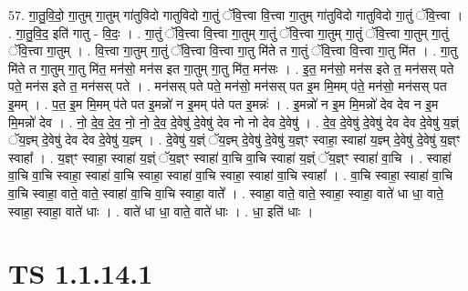 \documentclass[17pt]{extarticle}
\begin{document}
57. गा॒तु॒वि॒दो॒ गा॒तुम् गा॒तुम् गा॑तुविदो गातुविदो गा॒तुं ॅवि॒त्त्वा वि॒त्त्वा गा॒तुम् गा॑तुविदो गातुविदो गा॒तुं ॅवि॒त्त्वा । . गा॒तु॒वि॒द॒ इति॑ गातु - वि॒दः॒ । . गा॒तुं ॅवि॒त्त्वा वि॒त्त्वा गा॒तुम् गा॒तुं ॅवि॒त्त्वा गा॒तुम् गा॒तुं ॅवि॒त्त्वा गा॒तुम् गा॒तुं ॅवि॒त्त्वा गा॒तुम् । . वि॒त्त्वा गा॒तुम् गा॒तुं ॅवि॒त्त्वा वि॒त्त्वा गा॒तु मि॑ते त गा॒तुं ॅवि॒त्त्वा वि॒त्त्वा गा॒तु मि॑त । . गा॒तु मि॑ते त गा॒तुम् गा॒तु मि॑त॒ मन॑सो॒ मन॑स इत गा॒तुम् गा॒तु मि॑त॒ मन॑सः । . इ॒त॒ मन॑सो॒ मन॑स इते त॒ मन॑सस् पते पते॒ मन॑स इते त॒ मन॑सस् पते । . मन॑सस् पते पते॒ मन॑सो॒ मन॑सस् पत इ॒म मि॒मम् प॑ते॒ मन॑सो॒ मन॑सस् पत इ॒मम् । . प॒त॒ इ॒म मि॒मम् प॑ते पत इ॒मन्नो॑ न इ॒मम् प॑ते पत इ॒मन्नः॑ । . इ॒मन्नो॑ न इ॒म मि॒मन्नो॑ देव देव न इ॒म मि॒मन्नो॑ देव । . नो॒ दे॒व॒ दे॒व॒ नो॒ नो॒ दे॒व॒ दे॒वेषु॑ दे॒वेषु॑ देव नो नो देव दे॒वेषु॑ । . दे॒व॒ दे॒वेषु॑ दे॒वेषु॑ देव देव दे॒वेषु॑ य॒ज्ञ्ं ॅय॒ज्ञ्म् दे॒वेषु॑ देव देव दे॒वेषु॑ य॒ज्ञ्म् । . दे॒वेषु॑ य॒ज्ञ्ं ॅय॒ज्ञ्म् दे॒वेषु॑ दे॒वेषु॑ य॒ज्ञ्ꣳ स्वाहा॒ स्वाहा॑ य॒ज्ञ्म् दे॒वेषु॑ दे॒वेषु॑ य॒ज्ञ्ꣳ स्वाहा᳚ । . य॒ज्ञ्ꣳ स्वाहा॒ स्वाहा॑ य॒ज्ञ्ं ॅय॒ज्ञ्ꣳ स्वाहा॑ वा॒चि वा॒चि स्वाहा॑ य॒ज्ञ्ं ॅय॒ज्ञ्ꣳ स्वाहा॑ वा॒चि । . स्वाहा॑ वा॒चि वा॒चि स्वाहा॒ स्वाहा॑ वा॒चि स्वाहा॒ स्वाहा॑ वा॒चि स्वाहा॒ स्वाहा॑ वा॒चि स्वाहा᳚ । . वा॒चि स्वाहा॒ स्वाहा॑ वा॒चि वा॒चि स्वाहा॒ वाते॒ वाते॒ स्वाहा॑ वा॒चि वा॒चि स्वाहा॒ वाते᳚ । . स्वाहा॒ वाते॒ वाते॒ स्वाहा॒ स्वाहा॒ वाते॑ धा धा॒ वाते॒ स्वाहा॒ स्वाहा॒ वाते॑ धाः । . वाते॑ धा धा॒ वाते॒ वाते॑ धाः । . धा॒ इति॑ धाः । \newline
\pagebreak
{}
\section*{ TS 1.1.14.1 }
\end{document}
